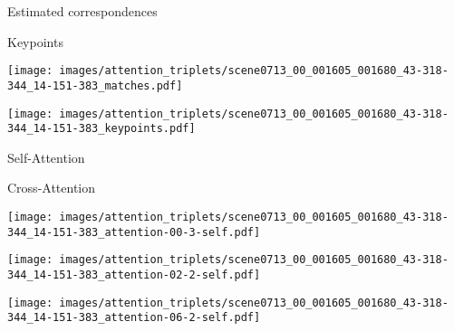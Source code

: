 \documentclass[10pt,twocolumn,letterpaper]{article}
\renewcommand{\*}[1]{\mathbf{#1}}
\newcommand{\0}{\phantom{0}}
\begin{document}
\begin{figure*}[ht!]
\centering
\def\iwidth{0.445}
\def\circOne{\raisebox{.5pt}{\textcircled{\raisebox{-.9pt} {1}}}}
\def\circTwo{\raisebox{.5pt}{\textcircled{\raisebox{-.9pt} {2}}}}
\def\circThree{\raisebox{.5pt}{\textcircled{\raisebox{-.9pt} {3}}}}
\begin{minipage}{\iwidth\textwidth}
    \centering
    \small{Estimated correspondences}
\end{minipage}\hspace{5mm}\begin{minipage}{\iwidth\textwidth}
    \centering
    \small{Keypoints}
\end{minipage}

\begin{minipage}{\iwidth\textwidth}
    \texttt{[image: images/attention\_triplets/scene0713\_00\_001605\_001680\_43-318-344\_14-151-383\_matches.pdf]}
\end{minipage}\hspace{5mm}\begin{minipage}{\iwidth\textwidth}
    \texttt{[image: images/attention\_triplets/scene0713\_00\_001605\_001680\_43-318-344\_14-151-383\_keypoints.pdf]}
\end{minipage}
\vspace{3mm}

\begin{minipage}{\iwidth\textwidth}
    \centering
    \small{Self-Attention}
\end{minipage}\hspace{5mm}\begin{minipage}{\iwidth\textwidth}
    \centering
    \small{Cross-Attention}
\end{minipage}
\vspace{.6mm}

\begin{minipage}{\iwidth\textwidth}
    \texttt{[image: images/attention\_triplets/scene0713\_00\_001605\_001680\_43-318-344\_14-151-383\_attention-00-3-self.pdf]}
    
    \vspace{.5mm}
    \texttt{[image: images/attention\_triplets/scene0713\_00\_001605\_001680\_43-318-344\_14-151-383\_attention-02-2-self.pdf]}
    
    \vspace{.5mm}
    \texttt{[image: images/attention\_triplets/scene0713\_00\_001605\_001680\_43-318-344\_14-151-383\_attention-06-2-self.pdf]}
    

\end{minipage}
\end{figure*}
\end{document}
